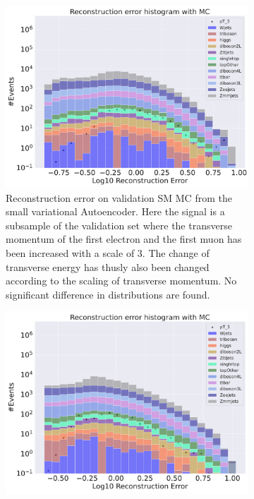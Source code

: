 \begin{figure}[h!]
    \centering
    \begin{subfigure}{.45\textwidth}
        \includegraphics[width=\textwidth]{Figures/VAE_testing/small/b_data_recon_big_rm3_feats_sig_pT_3.pdf}
        \caption{Reconstruction error on validation SM MC from the small variational Autoencoder. Here the signal is a subsample of the validation 
        set where the transverse momentum of the first electron and the first muon has been increased with a scale of $3$. The change of transverse 
        energy has thusly also been changed according to the scaling of transverse momentum. No significant difference in distributions are found. }
        \label{fig:VAE_small_pt_3}
    \end{subfigure}
    \hfill 
    \begin{subfigure}{.45\textwidth}
        \includegraphics[width=\textwidth]{Figures/VAE_testing/big/b_data_recon_big_rm3_feats_sig_pT_3.pdf}

\end{subfigure}
\end{figure}
